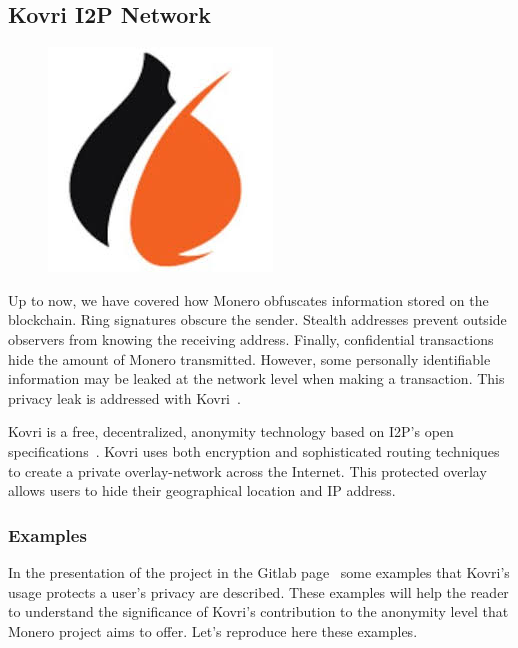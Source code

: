\subsection{Kovri I2P Network} \label{sec:Kovri}
\begin{figure}
\centering
\includegraphics[height=0.28\textwidth]{Images/Kovri/kovri.jpg}
\end{figure}
Up to now, we have covered how Monero obfuscates information stored on the blockchain. Ring signatures obscure the sender. Stealth addresses prevent outside observers from knowing the receiving address. Finally, confidential transactions hide the amount of Monero transmitted. However, some personally identifiable information may be leaked at the network level when making a transaction. This privacy leak is addressed with Kovri~\cite{kovri}.

Kovri is a free, decentralized, anonymity technology based on I2P's open specifications~\cite{i2p}. Kovri uses both encryption and sophisticated routing techniques to create a private overlay-network across the Internet. This protected overlay allows users to hide their geographical location and IP address.

\subsubsection{Examples}
In the presentation of the project in the Gitlab page~\cite{git_kovri} some examples that Kovri's usage protects a user's privacy are described. These examples will help the reader to understand the significance of Kovri's contribution to the anonymity level that Monero project aims to offer. Let's reproduce here these examples.

